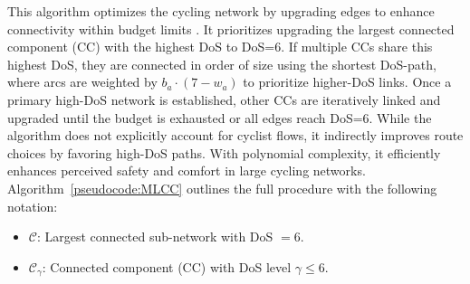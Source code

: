 \documentclass[letterpaper, 10 pt, conference]{ieeeconf}  %
\begin{document}
This algorithm optimizes the cycling network by upgrading edges to enhance connectivity within budget limits \cite{2024graphbased}. It prioritizes upgrading the largest connected component (CC) with the highest DoS to DoS=6. If multiple CCs share this highest DoS, they are connected in order of size using the shortest DoS-path, where arcs are weighted by $b_a \cdot (7 - w_a)$ to prioritize higher-DoS links. Once a primary high-DoS network is established, other CCs are iteratively linked and upgraded until the budget is exhausted or all edges reach DoS=6. While the algorithm does not explicitly account for cyclist flows, it indirectly improves route choices by favoring high-DoS paths. With polynomial complexity, it efficiently enhances perceived safety and comfort in large cycling networks. Algorithm~\ref{pseudocode:MLCC} outlines the full procedure with the following notation:
\begin{itemize}
    \item $\mathcal{C}$: Largest connected sub-network with DoS $=6$.
    \item $\mathcal{C}_{\gamma}$: Connected component (CC) with DoS level $\gamma \leq 6$.
\end{itemize}
\end{document}
